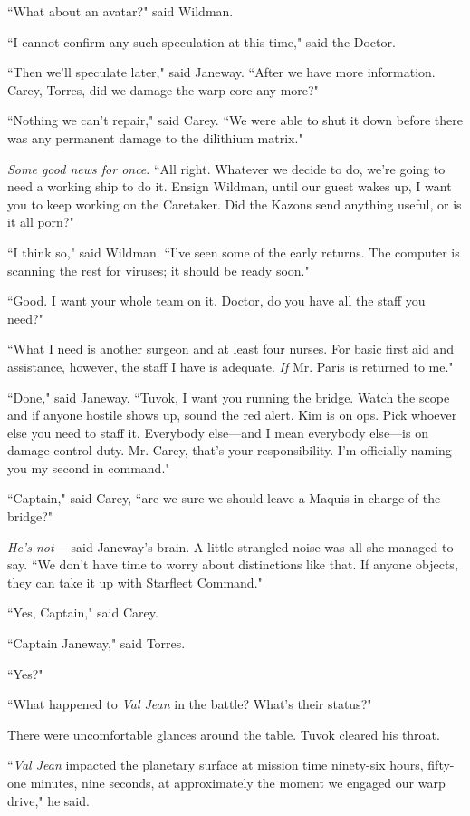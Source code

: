 \documentclass[twoside,letterpaper,12pt]{memoir}
\begin{document}
``What about an avatar?" said Wildman. 

``I cannot confirm any such speculation at this time," said the Doctor. 

``Then we'll speculate later," said Janeway. ``After we have more information. Carey, Torres, did we damage the warp core any more?" 

``Nothing we can't repair," said Carey. ``We were able to shut it down before there was any permanent damage to the dilithium matrix." 

\textit{Some good news for once}. ``All right. Whatever we decide to do, we're going to need a working ship to do it. Ensign Wildman, until our guest wakes up, I want you to keep working on the Caretaker. Did the Kazons send anything useful, or is it all porn?" 

``I think so," said Wildman. ``I've seen some of the early returns. The computer is scanning the rest for viruses; it should be ready soon." 

``Good. I want your whole team on it. Doctor, do you have all the staff you need?" 

``What I need is another surgeon and at least four nurses. For basic first aid and assistance, however, the staff I have is adequate. \textit{If} Mr. Paris is returned to me." 

``Done," said Janeway. ``Tuvok, I want you running the bridge. Watch the scope and if anyone hostile shows up, sound the red alert. Kim is on ops. Pick whoever else you need to staff it. Everybody else---and I mean everybody else---is on damage control duty. Mr. Carey, that's your responsibility. I'm officially naming you my second in command." 

``Captain," said Carey, ``are we sure we should leave a Maquis in charge of the bridge?" 

\textit{He's not---} said Janeway's brain. A little strangled noise was all she managed to say. ``We don't have time to worry about distinctions like that. If anyone objects, they can take it up with Starfleet Command." 

``Yes, Captain," said Carey. 

``Captain Janeway," said Torres. 

``Yes?" 

``What happened to \textit{Val Jean} in the battle? What's their status?" 

There were uncomfortable glances around the table. Tuvok cleared his throat. 

``\textit{Val Jean} impacted the planetary surface at mission time ninety-six hours, fifty-one minutes, nine seconds, at approximately the moment we engaged our warp drive," he said. 
\end{document}
